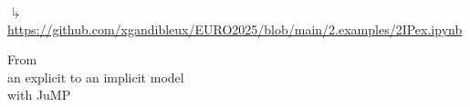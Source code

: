 \documentclass[]{beamer}
\begin{document}
\begin{frame}
\vspace{1mm}
 \hspace{5mm}$\drsh$ {\tiny \url{https://github.com/xgandibleux/EURO2025/blob/main/2.examples/2IPex.ipynb}}
\end{frame}



% 
%
\begin{frame}

\begin{center} 
\Large{From \\ an explicit to an implicit model \\ with JuMP}
\end{center}
              
\end{frame}

% 
%
\end{document}
